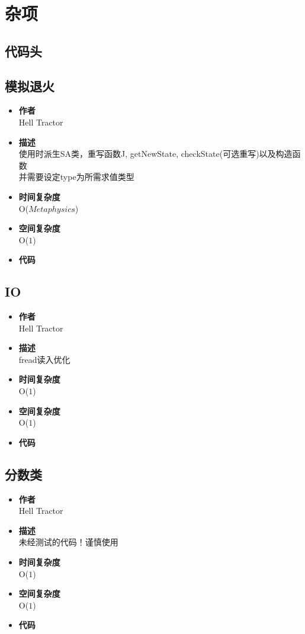 \documentclass[a4paper,11pt,twoside,fontset = fandol,UTF8]{ctexbook}
\newcommand{\code}[5]{
  \begin{itemize}
    \setlength{\itemsep}{0pt}
    \item \textbf{作者} \\ #1
    \item \textbf{描述} \\ #2
    \item \textbf{时间复杂度} \\ O($ #3 $)
    \item \textbf{空间复杂度} \\ O($ #4 $)
    \item \textbf{代码}
    
  \end{itemize}
}
\begin{document}
  \chapter{杂项}
  \section{代码头}
  
  \section{模拟退火}
  \code{Hell Tractor}{
    使用时派生SA类，重写函数J, getNewState, checkState(可选重写)以及构造函数 \\
    并需要设定type为所需求值类型
  }{Metaphysics}{1}{codes/SA.cpp}
  \section{IO}
  \code{Hell Tractor}{fread读入优化}{1}{1}{codes/IO.cpp}
  \section{分数类}
  \code{Hell Tractor}{{\color{orange}未经测试的代码！谨慎使用}}{1}{1}{codes/Fraction.cpp}
\end{document}
